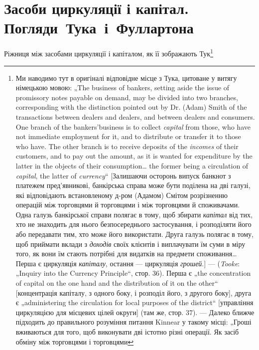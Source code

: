 
\section{Засоби циркуляції і капітал.
Погляди~Тука~і~Фуллартона}

Ріжниця між засобами циркуляції і капіталом, як її зображають Тук\footnote{Ми наводимо тут в оригіналі відповідне місце з Тука, цитоване у витягу німецькою мовою:
„The business of bankers, setting aside the
issue of promissory notes payable on demand, may be divided into two branches,
corresponding with the distinction pointed out by Dr. (Adam) Smith of the transactions between
dealers and dealers, and between dealers and consumers. One branch
of the bankers’business is to collect \emph{capital} from those, who have not immediate
employment for it, and to distribute or transfer it to those who have. The other
branch is to receive deposits of the \emph{incomes} of their customers, and to pay out
the amount, as it is wanted for expenditure by the latter in the objects of their
consumption\dots{} the former being a circulation of \emph{capital}, the latter of \emph{currency}“ [Залишаючи
осторонь випуск банкнот з платежем пред’явникові, банкірська справа
може бути поділена на дві галузі, які відповідають встановленому д-ром (Адамом)
Смітом розрізненню операцій між торговцями й торговцями і між торговцями й
споживачами. Одна галузь банкірської справи полягає в тому, щоб збирати
\emph{капітал} від тих, хто не знаходить для нього безпосереднього застосування,
і розподіляти його або передавати тим, хто може його використати. Друга галузь
полягає в тому, щоб приймати вклади з \emph{доходів} своїх клієнтів і виплачувати їм
суми в міру того, як вони їм стають потрібні для видатків на предмети споживання\dots{} Перша є
циркуляція \emph{капіталу}, остання — циркуляція \emph{грошей}.] —
(\emph{Tooke}: „Inquiry into the Currency Principle“, стор. 36). Перша є „the concentration of capital on
the one hand and the distribution of it on the other“ [концентрація
капіталу, з одного боку, і розподіл його, з другого боку], друга є „administering
the circulation for local purposes of the district“ [управління циркуляцією для
місцевих цілей округи] (там же, стор. 37). — Далеко ближче підходить до
правильного розуміння питання Kinnear у такому місці: „Гроші вживаються
для того, щоб виконувати дві істотно різні операції. Як засіб обміну між торговцями і торговцями
}
